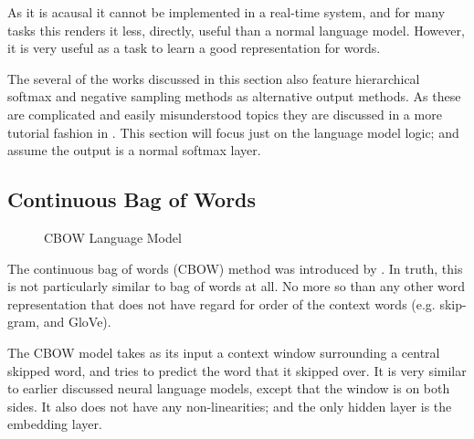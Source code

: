 {As it is acausal it cannot be implemented in a real-time system, and for many tasks this renders it less, directly, useful than a normal language model. 
However, it is very useful as a task to learn a good representation for words.




The several of the works discussed in this section also feature hierarchical softmax and negative sampling methods as alternative output methods.
As these are complicated and easily misunderstood topics they are discussed in a more tutorial fashion in .
This section will focus just on the language model logic; and assume the output is a normal softmax layer.

\subsection{Continuous Bag of Words}\label{sec:cbow}
\begin{figure}
	\caption{CBOW Language Model}
	\label{fig:cbow}
	\centering
	\resizebox{\textwidth}{!}{}
\end{figure}

The continuous bag of words (CBOW) method was introduced by .
In truth, this is not particularly similar to bag of words at all.
No more so than any other word representation that does not have regard for order of the context words (e.g. skip-gram, and GloVe).

The CBOW model takes as its input a context window surrounding a central skipped word, and tries to predict the word that it skipped over.
It is very similar to earlier discussed neural language models, except that the window is on both sides.
It also does not have any non-linearities;
and the only hidden layer is the embedding layer.

}
